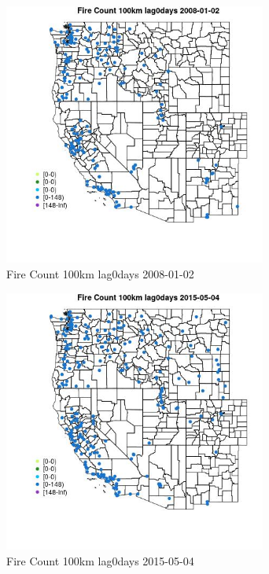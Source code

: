 \begin{figure} 
\centering  
\includegraphics[width=0.77\textwidth]{Code_Outputs/Report_ML_input_PM25_Step4_part_e_de_duplicated_aves_compiled_2019-05-18wNAs_MapObsFire_Count_100km_lag0days2008-01-02.jpg} 
\caption{\label{fig:Report_ML_input_PM25_Step4_part_e_de_duplicated_aves_compiled_2019-05-18wNAsMapObsFire_Count_100km_lag0days2008-01-02}Fire Count 100km lag0days 2008-01-02} 
\end{figure} 
 

\begin{figure} 
\centering  
\includegraphics[width=0.77\textwidth]{Code_Outputs/Report_ML_input_PM25_Step4_part_e_de_duplicated_aves_compiled_2019-05-18wNAs_MapObsFire_Count_100km_lag0days2015-05-04.jpg} 
\caption{\label{fig:Report_ML_input_PM25_Step4_part_e_de_duplicated_aves_compiled_2019-05-18wNAsMapObsFire_Count_100km_lag0days2015-05-04}Fire Count 100km lag0days 2015-05-04} 
\end{figure} 
 

